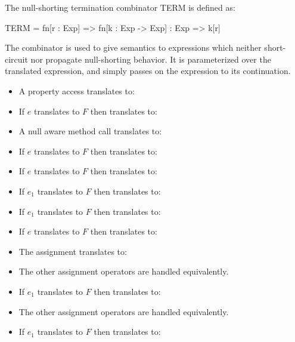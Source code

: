 \documentclass[makeidx]{article}
\begin{document}
{The null-shorting termination combinator TERM is defined as:
\begin{dartCode}
  TERM = fn[r : Exp] => fn[k : Exp -> Exp] : Exp => k[r]
\end{dartCode}

The  combinator is used to give semantics to expressions which neither
short-circuit nor propagate null-shorting behavior.  It is parameterized over
the translated expression, and simply passes on the expression to its
continuation.

\begin{itemize}
\item A property access  translates to:
\item If $e$ translates to $F$ then  translates to:
\item A null aware method call  translates to:
\item If $e$ translates to $F$ then  translates to:
\item If $e$ translates to $F$ then  translates to:
\item If $e_1$ translates to $F$ then  translates to:
\item If $e_1$ translates to $F$ then  translates to:
\item If $e$ translates to $F$ then  translates to:
\item The assignment  translates to:
\item The other assignment operators are handled equivalently.
\item If $e_1$ translates to $F$ then  translates to:
\item The other assignment operators are handled equivalently.
\item If $e_1$ translates to $F$ then  translates to:

\end{itemize}}
\end{document}
